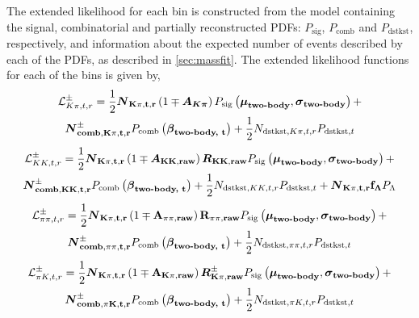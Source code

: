 The extended likelihood for each bin is constructed from the model containing the signal, combinatorial and partially reconstructed PDFs: $P_{\text{sig}}$, $P_{\text{comb}}$ and $P_{\text{dstkst}}$, respectively, and information about the expected number of events described by each of the PDFs, as described in \sect\ref{sec:massfit}. The extended likelihood functions for each of the bins is given by,
\begin{multline}
\mathcal{L}_{K\pi, t, r}^{\pm} = \frac{1}{2}\mathbf{\boldsymbol N_{K\pi, t, r}}\left(1 \mp \mathbf{\boldsymbol {A_{K\pi}}}\right)P_{\text{sig}}\left(\mathbf{\boldsymbol\mu_\text{\textbf{two-body}}},\mathbf{\boldsymbol\sigma_\text{\textbf{two-body}}}\right) + \\ \mathbf{\boldsymbol N_{\textbf{comb}, K\pi, t, r}^{\pm}}P_{\text{comb}}\left(\mathbf{\boldsymbol\beta_\text{\textbf{two-body, t}}}\right) + \frac{1}{2}N_{\text{dstkst}, K\pi, t, r}P_{\text{dstkst}, t}
\label{kpilikelihood}
\end{multline}
\begin{multline}
\mathcal{L}_{KK, t, r}^{\pm} = \frac{1}{2}\mathbf{\boldsymbol N_{K\pi, t, r}}\left(1 \mp \mathbf{\boldsymbol A_{KK, raw}}\right)\mathbf{\boldsymbol R_{KK, raw}} P_{\text{sig}}\left(\mathbf{\boldsymbol\mu_\text{\textbf{two-body}}},\mathbf{\boldsymbol\sigma_\text{\textbf{two-body}}}\right) + \\ \mathbf{\boldsymbol N_{\textbf{comb}, KK, t, r}^{\pm}}P_{\text{comb}}\left(\mathbf{\boldsymbol\beta_\text{\textbf{two-body, t}}}\right) + \frac{1}{2}N_{\text{dstkst}, KK, t, r}P_{\text{dstkst}, t} + \mathbf{\boldsymbol N_{K\pi, t, r}}\mathbf{f_{\Lambda}}P_{\Lambda}
\end{multline}
\begin{multline}
\mathcal{L}_{\pi\pi, t, r}^{\pm} = \frac{1}{2}\mathbf{\boldsymbol N_{K\pi, t, r}}\left(1 \mp \mathbf{A_{\pi\pi, raw}}\right)\mathbf{R_{\pi\pi, raw}} P_{\text{sig}}\left(\mathbf{\boldsymbol\mu_\text{\textbf{two-body}}},\mathbf{\boldsymbol\sigma_\text{\textbf{two-body}}}\right) + \\ \mathbf{\boldsymbol N_{\textbf{comb}, \pi\pi, t, r}^{\pm}}P_{\text{comb}}\left(\mathbf{\boldsymbol\beta_\text{\textbf{two-body, t}}}\right) + \frac{1}{2}N_{\text{dstkst}, \pi\pi, t, r}P_{\text{dstkst}, t}
\end{multline}
\begin{multline}
\mathcal{L}_{\pi K, t, r}^{\pm} = \frac{1}{2}\mathbf{\boldsymbol N_{K\pi, t, r}}\left(1 \mp \mathbf{A_{K\pi, raw}}\right)\mathbf{\boldsymbol R_{K\pi, raw}^{\pm}} P_{\text{sig}}\left(\mathbf{\boldsymbol\mu_\text{\textbf{two-body}}},\mathbf{\boldsymbol\sigma_\text{\textbf{two-body}}}\right) + \\ \mathbf{\boldsymbol N_{\textbf{comb}, \pi K, t, r}^{\pm}}P_{\text{comb}}\left(\mathbf{\boldsymbol\beta_\text{\textbf{two-body, t}}}\right) + \frac{1}{2}N_{\text{dstkst}, \pi K, t, r}P_{\text{dstkst}, t}
\end{multline}
